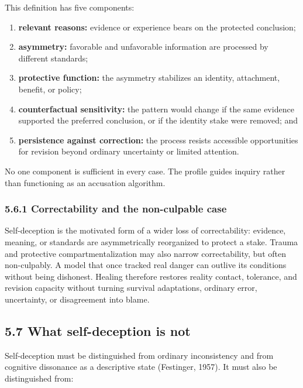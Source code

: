 \documentclass[
  11pt,
]{article}
\providecommand{\tightlist}{%
  \setlength{\itemsep}{0pt}\setlength{\parskip}{0pt}}
\begin{document}
This definition has five components:

\begin{enumerate}
\def\labelenumi{\arabic{enumi}.}
\tightlist
\item
  \textbf{relevant reasons:} evidence or experience bears on the
  protected conclusion;
\item
  \textbf{asymmetry:} favorable and unfavorable information are
  processed by different standards;
\item
  \textbf{protective function:} the asymmetry stabilizes an identity,
  attachment, benefit, or policy;
\item
  \textbf{counterfactual sensitivity:} the pattern would change if the
  same evidence supported the preferred conclusion, or if the identity
  stake were removed; and
\item
  \textbf{persistence against correction:} the process resists
  accessible opportunities for revision beyond ordinary uncertainty or
  limited attention.
\end{enumerate}

No one component is sufficient in every case. The profile guides inquiry
rather than functioning as an accusation algorithm.

\subsubsection{5.6.1 Correctability and the non-culpable
case}\label{correctability-and-the-non-culpable-case}

Self-deception is the motivated form of a wider loss of correctability:
evidence, meaning, or standards are asymmetrically reorganized to
protect a stake. Trauma and protective compartmentalization may also
narrow correctability, but often non-culpably. A model that once tracked
real danger can outlive its conditions without being dishonest. Healing
therefore restores reality contact, tolerance, and revision capacity
without turning survival adaptations, ordinary error, uncertainty, or
disagreement into blame.

\subsection{5.7 What self-deception is
not}\label{what-self-deception-is-not}

Self-deception must be distinguished from ordinary inconsistency and
from cognitive dissonance as a descriptive state (Festinger, 1957). It
must also be distinguished from:
\end{document}
